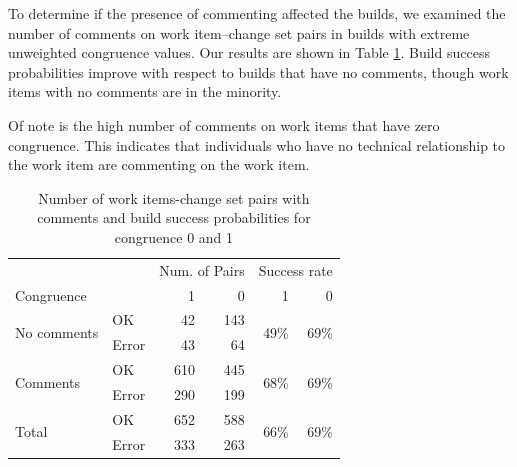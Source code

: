 




To determine if the presence of commenting affected the builds, we examined the number of comments on work item--change set pairs in builds with extreme unweighted congruence values. Our results are shown in Table \ref{tab:changeset_commenters}. Build success probabilities improve with respect to builds that have no comments, though work items with no comments are in the minority.

Of note is the high number of comments on work items that have zero congruence. This indicates that individuals who have no technical relationship to the work item are commenting on the work item.

\begin{table}[t]
\centering
\begin{tabular}{ll|rr|rr}
& & \multicolumn{2}{c|}{Num. of Pairs} & \multicolumn{2}{c}{Success rate} \\
Congruence &                                & 1     & 0   & 1 & 0 \\\hline 
\multirow{2}{*}{No comments} 	& OK 	  & 42   & 143  &  \multirow{2}{*}{49\%} & \multirow{2}{*}{69\%}  \\
                            	& Error   & 43    & 64   &  & \\\hline
\multirow{2}{*}{Comments} 	& OK 	  & 610  & 445  & \multirow{2}{*}{68\%} & \multirow{2}{*}{69\%}  \\
                         	& Error   & 290   & 199  &  & \\\hline
\multirow{2}{*}{Total} 		& OK		  & 652 & 588 &     \multirow{2}{*}{66\%} & \multirow{2}{*}{69\%}   \\
                       		& Error   & 333  & 263 & &\\
\end{tabular}
\caption{Number of work items-change set pairs with comments and build success probabilities for congruence 0 and 1}
\label{tab:changeset_commenters}
\end{table}

